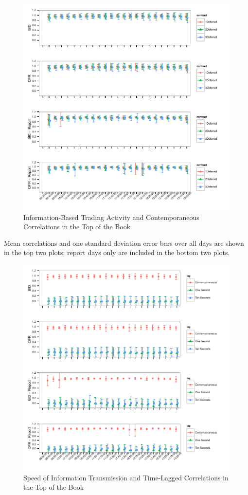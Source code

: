 \documentclass[10pt,review]{elsarticle}
\begin{document}
\begin{figure}[htbp]
\centering
\includegraphics{TablesFigures_files/figure-latex/unnamed-chunk-4-1.pdf}
\caption{Information-Based Trading Activity and Contemporaneous
Correlations in the Top of the Book}
\end{figure}

Mean correlations and one standard deviation error bars over all days
are shown in the top two plots; report days only are included in the
bottom two plots.

\clearpage

\begin{figure}[htbp]
\centering
\includegraphics{TablesFigures_files/figure-latex/unnamed-chunk-5-1.pdf}
\caption{Speed of Information Transmission and Time-Lagged Correlations
in the Top of the Book}
\end{figure}
\end{document}
